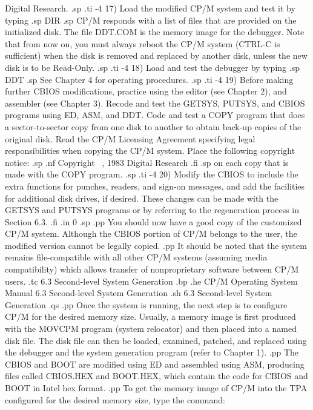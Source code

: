 Digital Research.
.sp
.ti -4
17) Load the modified CP/M system and test it by typing
.sp
DIR
.sp
CP/M responds with a list of files that are provided on the 
initialized disk.  The file DDT.COM is the memory image for the 
debugger.  Note that from now on, you must always reboot the 
CP/M system (CTRL-C is sufficient) when the disk is removed and 
replaced by another disk, unless the new disk is to be Read-Only.
.sp
.ti -4
18) Load and test the debugger by typing
.sp
DDT
.sp
See Chapter 4 for operating procedures.
.sp
.ti -4
19) Before making further CBIOS modifications, practice using the 
editor (see Chapter 2), and assembler (see Chapter 3).  Recode 
and test the GETSYS, PUTSYS, and CBIOS programs using ED, ASM, 
and DDT.  Code and test a COPY program that does a sector-to-sector 
copy from one disk to another to obtain back-up copies of 
the original disk.  Read the CP/M Licensing Agreement specifying 
legal responsibilities when copying the CP/M system.  Place the 
following copyright notice:
.sp
.nf
Copyright  \ , 1983
 Digital Research 
.fi
.sp
on each copy that is made with the COPY program.
.sp
.ti -4
20) Modify the CBIOS to include the extra functions for punches, 
readers, and sign-on messages, and add the facilities for 
additional disk drives, if desired.  These changes can be made 
with the GETSYS and PUTSYS programs or by referring to the 
regeneration process in Section 6.3.
.fi
.in 0
.sp
.pp
You should now have a good copy of the customized CP/M 
system.  Although the CBIOS portion of CP/M belongs to the user, 
the modified version cannot be legally copied.
.pp
It should be noted that the system remains file-compatible with 
all other CP/M systems (assuming media compatibility) which 
allows transfer of nonproprietary software between CP/M users.
.tc    6.3  Second-level System Generation
.bp
.he CP/M Operating System Manual  6.3  Second-level System Generation
.sh
6.3  Second-level System Generation
.qs
.pp
Once the system is running, the next step is to configure CP/M 
for the desired memory size.  Usually, a memory image is first 
produced with the MOVCPM program (system relocator) and then 
placed into a named disk file.  The disk file can then be loaded, 
examined, patched, and replaced using the debugger and the 
system generation program (refer to Chapter 1).
.pp
The CBIOS and BOOT are modified using ED and assembled using ASM, 
producing files called CBIOS.HEX and BOOT.HEX, which contain the 
code for CBIOS and BOOT in Intel hex format.
.pp
To get the memory image of CP/M into the TPA configured for the 
desired memory size, type the command:
